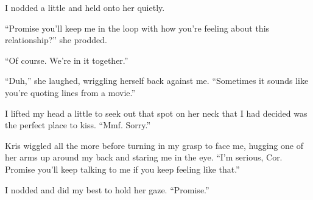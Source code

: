 I nodded a little and held onto her quietly.

``Promise you'll keep me in the loop with how you're feeling about this relationship?'' she prodded.

``Of course.  We're in it together.''

``Duh,'' she laughed, wriggling herself back against me.  ``Sometimes it sounds like you're quoting lines from a movie.''

I lifted my head a little to seek out that spot on her neck that I had decided was the perfect place to kiss.  ``Mmf.  Sorry.''

Kris wiggled all the more before turning in my grasp to face me, hugging one of her arms up around my back and staring me in the eye.  ``I'm serious, Cor.  Promise you'll keep talking to me if you keep feeling like that.''

I nodded and did my best to hold her gaze.  ``Promise.''
